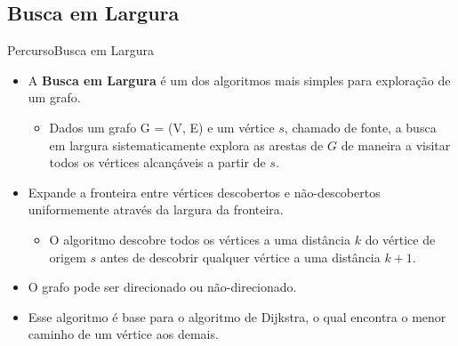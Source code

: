 \documentclass{beamer}
\begin{document}
\subsection{Busca em Largura}

\begin{frame}{Percurso}{Busca em Largura}
\begin{itemize}
\item A {\bf Busca em Largura} é um dos algoritmos mais simples para exploração de um grafo.
\begin{itemize}
\item Dados um grafo G = (V, E) e um vértice $s$, chamado de fonte, a busca em largura sistematicamente explora as arestas de $G$ de maneira a visitar todos os vértices alcançáveis a partir de $s$.
\end{itemize}
\item  Expande a fronteira entre vértices descobertos e não-descobertos uniformemente através da largura da fronteira.
  \begin{itemize}
  \item O algoritmo descobre todos os vértices a uma distância $k$ do vértice de origem $s$ antes de descobrir qualquer vértice a uma distância $k + 1$.
  \end{itemize}
\item O grafo pode ser direcionado ou não-direcionado.
\item Esse algoritmo é base para o algoritmo de Dijkstra, o qual encontra o menor caminho de um vértice aos demais.
\end{itemize}
\end{frame}
\end{document}
